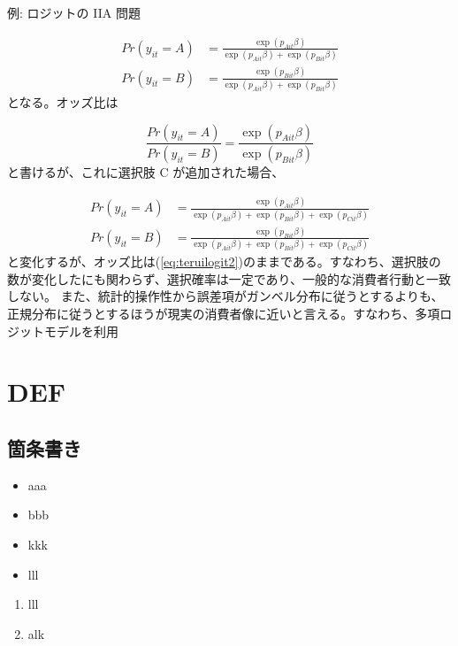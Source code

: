 \documentclass[11pt]{jsarticle}
\begin{document}
例: ロジットの IIA 問題

\begin{align} \label{eq:teruilogit}
Pr(y_{it}=A) &= \frac{\exp(p_{Ait} \beta)} {\exp(p_{Ait} \beta) + \exp(p_{Bit} \beta)} \\ %
\nonumber Pr(y_{it}=B) &= \frac{\exp(p_{Bit} \beta)} {\exp(p_{Ait} \beta) + \exp(p_{Bit} \beta)} %
\end{align}
となる。オッズ比は

\begin{equation} \label{eq:teruilogit2}
  \frac {Pr(y_{it}=A) } {Pr(y_{it}=B)} = \frac {\exp(p_{Ait} \beta)} {\exp(p_{Bit} \beta)}
\end{equation}
と書けるが、これに選択肢 C が追加された場合、

\begin{align} \label{eq:teruilogit3}
Pr(y_{it}=A) &= \frac{\exp(p_{Ait} \beta)} {\exp(p_{Ait} \beta) + \exp(p_{Bit} \beta) + \exp(p_{Cit} \beta)} \\
Pr(y_{it}=B) &= \frac{\exp(p_{Bit} \beta)} {\exp(p_{Ait} \beta) + \exp(p_{Bit} \beta) + \exp(p_{Cit} \beta)}
\end{align}
と変化するが、オッズ比は(\ref{eq:teruilogit2})のままである。すなわち、選択肢の数が変化したにも関わらず、選択確率は一定であり、一般的な消費者行動と一致しない。
また、統計的操作性から誤差項がガンベル分布に従うとするよりも、正規分布に従うとするほうが現実の消費者像に近いと言える。すなわち、多項ロジットモデルを利用

\section{DEF}
\subsection{箇条書き}

\begin{itemize}
 \item aaa
 \item bbb
 \item kkk
 \item lll
\end{itemize}

\begin{enumerate}
 \item lll
 \item alk
\end{enumerate}
\end{document}
